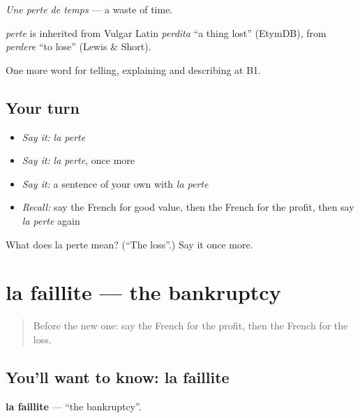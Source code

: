 \emph{Une perte de temps} — a waste of time.

\begin{cousinweb}
\emph{perte} is inherited from Vulgar Latin \emph{perdita} \textquotedblleft{}a thing lost\textquotedblright{} (EtymDB), from \emph{perdere} \textquotedblleft{}to lose\textquotedblright{} (Lewis \& Short).
\end{cousinweb}

\begin{grammarlens}[title={What you've built}]
One more word for telling, explaining and describing at B1.
\end{grammarlens}

\subsection*{Your turn}
\begin{itemize}
\raggedright
  \item \emph{Say it:} \emph{la perte}
  \item \emph{Say it:} \emph{la perte}, once more
  \item \emph{Say it:} a sentence of your own with \emph{la perte}
  \item \emph{Recall:} say the French for good value, then the French for the profit, then say \emph{la perte} again
\end{itemize}

\begin{tcolorbox}[breakable,colback=teal!4,colframe=teal!35!black,title={Before you move on}]
What does la perte mean? (\textquotedblleft{}The loss\textquotedblright{}.) Say it once more.
\end{tcolorbox}
\section[la faillite]{la faillite — the bankruptcy}

\label{lesson:FR-C394-faillite}



\begin{quote}
Before the new one: say the French for the profit, then the French for the loss.
\end{quote}

\subsection*{You'll want to know: la faillite}
\textbf{la faillite} — \textquotedblleft{}the bankruptcy\textquotedblright{}.

